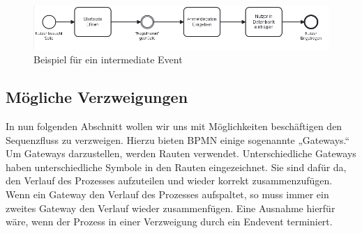 \begin{figure}
\centering
\includegraphics[width=15cm]{Figures/Beispiel3}
\decoRule
\caption[Intermediate Events]{Beispiel für ein intermediate Event}
\label{fig:Task}
\end{figure}

\subsection{Mögliche Verzweigungen}
 
In nun folgenden Abschnitt wollen wir uns mit Möglichkeiten beschäftigen den Sequenzfluss zu verzweigen. Hierzu bieten BPMN einige sogenannte „Gateways.“ Um Gateways darzustellen, werden Rauten verwendet. Unterschiedliche Gateways haben unterschiedliche Symbole in den Rauten eingezeichnet. Sie sind dafür da, den Verlauf des Prozesses aufzuteilen und wieder korrekt zusammenzufügen. Wenn ein Gateway den Verlauf des Prozesses aufspaltet, so muss immer ein zweites Gateway den Verlauf wieder zusammenfügen. Eine Ausnahme hierfür wäre, wenn der Prozess in einer Verzweigung durch ein Endevent terminiert.
